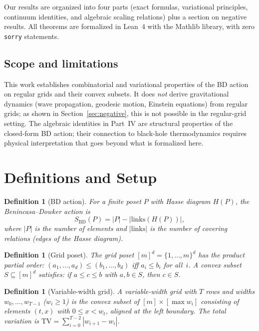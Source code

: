 \documentclass[11pt,a4paper]{article}
\newtheorem{definition}[theorem]{Definition}
\theoremstyle{remark}
\begin{document}
Our results are organized into four parts (exact formulas, variational
principles, continuum identities, and algebraic scaling relations) plus
a section on negative results. All theorems are formalized in Lean~4
with the Mathlib library, with zero \texttt{sorry} statements.

\subsection*{Scope and limitations}

This work establishes combinatorial and variational properties of the BD action
on regular grids and their convex subsets. It does \emph{not} derive
gravitational dynamics (wave propagation, geodesic motion, Einstein equations)
from regular grids; as shown in Section~\ref{sec:negative}, this is not possible
in the regular-grid setting. The algebraic identities in Part~IV are structural
properties of the closed-form BD action; their connection to black-hole
thermodynamics requires physical interpretation that goes beyond what is
formalized here.

\section{Definitions and Setup}\label{sec:defs}

\begin{definition}[BD action]
For a finite poset $P$ with Hasse diagram $H(P)$, the \emph{Benincasa--Dowker
action} is
\begin{equation}\label{eq:bd}
  S_{\mathrm{BD}}(P) = |P| - |\mathrm{links}(H(P))|,
\end{equation}
where $|P|$ is the number of elements and $|\mathrm{links}|$ is the number of
covering relations (edges of the Hasse diagram).
\end{definition}

\begin{definition}[Grid poset]
The \emph{grid poset} $[m]^d = \{1,\ldots,m\}^d$ has the product partial order:
$(a_1,\ldots,a_d) \leq (b_1,\ldots,b_d)$ iff $a_i \leq b_i$ for all~$i$.
A \emph{convex subset} $S \subseteq [m]^d$ satisfies: if $a \leq c \leq b$
with $a,b \in S$, then $c \in S$.
\end{definition}

\begin{definition}[Variable-width grid]
A \emph{variable-width grid} with $T$ rows and widths $w_0, \ldots, w_{T-1}$
($w_i \geq 1$) is the convex subset of $[m] \times [\max w_i]$ consisting of
elements $(t, x)$ with $0 \leq x < w_t$, aligned at the left boundary.
The \emph{total variation} is $\mathrm{TV} = \sum_{i=0}^{T-2} |w_{i+1} - w_i|$.
\end{definition}
\end{document}
